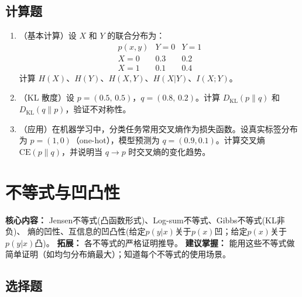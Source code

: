 \documentclass[12pt,a4paper]{ctexart}
\newcommand{\DKL}{D_{\mathrm{KL}}}
\begin{document}
\subsection*{计算题}

\begin{enumerate}[label=\textbf{\arabic*.}, leftmargin=*]
\item （基本计算）设 $X$ 和 $Y$ 的联合分布为：
\[
\begin{array}{c|cc}
p(x,y) & Y=0 & Y=1 \\
\hline
X=0 & 0.3 & 0.2 \\
X=1 & 0.1 & 0.4
\end{array}
\]
计算 $H(X)$、$H(Y)$、$H(X,Y)$、$H(X|Y)$、$I(X;Y)$。

\item （KL 散度）设 $p = (0.5,\, 0.5)$，$q = (0.8,\, 0.2)$。计算 $\DKL(p\|q)$ 和 $\DKL(q\|p)$，验证不对称性。

\item （应用）在机器学习中，分类任务常用交叉熵作为损失函数。设真实标签分布为 $p = (1,0)$（one-hot），模型预测为 $q = (0.9, 0.1)$。计算交叉熵 $\mathrm{CE}(p\|q)$，并说明当 $q \to p$ 时交叉熵的变化趋势。
\end{enumerate}

\newpage

\section{不等式与凹凸性}

\begin{notetested}
\textbf{核心内容：} Jensen不等式(凸函数形式)、Log-sum不等式、Gibbs不等式(KL非负)、
熵的凹性、互信息的凹凸性(给定$p(y|x)$关于$p(x)$凹；给定$p(x)$关于$p(y|x)$凸)。
\textbf{拓展：} 各不等式的严格证明推导。
\textbf{建议掌握：} 能用这些不等式做简单证明（如均匀分布熵最大）；知道每个不等式的使用场景。
\end{notetested}

\subsection*{选择题}
\end{document}
